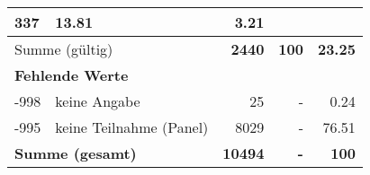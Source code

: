 \begin{longtable}{lXrrr}
       \num{337} &
       \num[round-mode=places,round-precision=2]{13,81} &
         \num[round-mode=places,round-precision=2]{3,21} \\
     \midrule
     \multicolumn{2}{l}{Summe (gültig)} &
       \textbf{\num{2440}} &
     \textbf{100} &
       \textbf{\num[round-mode=places,round-precision=2]{23,25}} \\
     \multicolumn{5}{l}{\textbf{Fehlende Werte}}\\
       -998 &
       keine Angabe &
         \num{25} &
        - &
         \num[round-mode=places,round-precision=2]{0,24} \\
       -995 &
       keine Teilnahme (Panel) &
         \num{8029} &
        - &
         \num[round-mode=places,round-precision=2]{76,51} \\
     \midrule
     \multicolumn{2}{l}{\textbf{Summe (gesamt)}} &
          \textbf{\num{10494}} &
        \textbf{-} &
        \textbf{100} \\
     \bottomrule
     \end{longtable}
     
